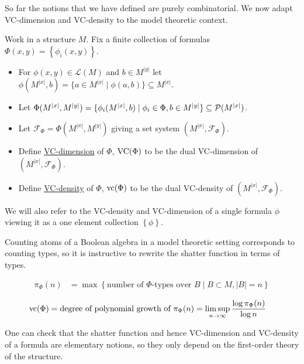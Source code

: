 \documentclass{amsart}
\newcommand{\F}{\mathcal F}
\renewcommand{\LL}{\mathcal L}
\newcommand{\curly}[1]{\left\{#1\right\}}
\newcommand{\defn}{\underline}
\begin{document}
So far the notions that we have defined are purely combinatorial.
We now adapt VC-dimension and VC-density to the model theoretic context.

\begin{Definition}
  Work in a structure $M$.
  Fix a finite collection of formulas $\Phi(x, y) = \curly{\phi_i(x, y)}$.

  \begin{itemize}
  \item For $\phi(x, y) \in \LL(M)$ and $b \in M^{|y|}$ let $\phi(M^{|x|}, b) = \{a \in M^{|x|} \mid \phi(a, b)\} \subseteq M^{|x|}$.
  \item Let $\Phi(M^{|x|}, M^{|y|})= \{\phi_i(M^{|x|}, b) \mid \phi_i \in \Phi, b \in M^{|y|}\} \subseteq \mathcal P(M^{|x|})$.
  \item Let $\F_\Phi = \Phi(M^{|x|}, M^{|y|})$ giving a set system $(M^{|x|}, \F_\Phi)$.
  \item Define \defn{VC-dimension} of $\Phi$, $\operatorname{VC}(\Phi)$ to be the dual VC-dimension of $(M^{|x|}, \F_\Phi)$.
  \item Define \defn{VC-density} of $\Phi$, $\operatorname{vc}(\Phi)$ to be the dual VC-density of $(M^{|x|}, \F_\Phi)$.
  \end{itemize}

  We will also refer to the VC-density and VC-dimension of a single formula $\phi$
  viewing it as a one element collection $\curly{\phi}$.
\end{Definition}

Counting atoms of a Boolean algebra in a model theoretic setting corresponds to counting types,
so it is instructive to rewrite the shatter function in terms of types.

\begin{Definition} 
  \begin{align*}
    \pi_\Phi(n) &= \max \curly{\text{number of $\Phi$-types over $B$} \mid B \subset M, |B| = n}
  \end{align*}
\end{Definition}  

\begin{Lemma} \label{count_types}
  \begin{align*}
    \operatorname{vc}(\Phi) &= \text{degree of polynomial growth of $\pi_\Phi(n)$}  = \limsup_{n \to \infty}\frac{\log \pi_\Phi(n)}{\log n}
  \end{align*}  
\end{Lemma}

One can check that the shatter function and hence VC-dimension and VC-density of a formula are elementary notions,
so they only depend on the first-order theory of the structure.
\end{document}

